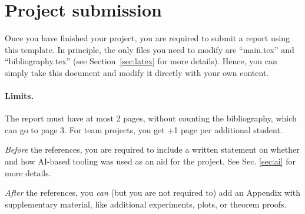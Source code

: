 \documentclass{article}
\begin{document}

\printAffiliationsAndNotice{}

\begin{abstract}
%
This is a \LaTeX template for writing your project report, to be submitted as part of the final exam. The template can not be modified (you can not change margins, spaces, etc.), and using this template is mandatory. Please read the main text for further details.
%
\end{abstract}

\section{Project submission}

Once you have finished your project, you are required to submit a report using this template. In principle, the only files you need to modify are ``main.tex'' and ``bibliography.tex'' (see Section~\ref{sec:latex} for more details). Hence, you can simply take this document and modify it directly with your own content.

\paragraph*{Limits.}
The report must have at most 2 pages, without counting the bibliography, which can go to page 3. For team projects, you get +1 page per additional student. 

\emph{Before} the references, you are required to include a written statement on whether and how AI-based tooling was used as an aid for the project. See Sec. \ref{sec:ai} for more details.

\emph{After} the references, you \emph{can} (but you are not required to) add an Appendix with supplementary material, like additional experiments, plots, or theorem proofs.
\end{document}
